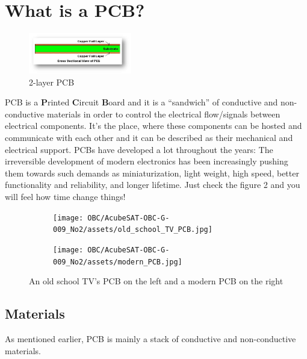 \documentclass[final]{cubedoc}
\begin{document}
	\section{What is a PCB?}
	
	\begin{figure}
		\centering
		\includegraphics[width=0.4\textwidth]{assets/simple_2_layer_PCB.jpg}
		\caption{2-layer PCB}
		\label{fig:1}
	\end{figure}
	
	PCB is a \textbf{P}rinted \textbf{C}ircuit \textbf{B}oard and it is  a “sandwich” of conductive and non-conductive materials in order to control the electrical flow/signals between electrical components. It’s the place, where these components can be hosted and communicate with each other and it can be described as their mechanical and electrical support. PCBs have developed a lot throughout the years: The irreversible development of modern electronics has been increasingly pushing them towards such demands as miniaturization, light weight, high speed, better functionality and reliability, and longer lifetime. Just check the figure 2 and you will feel how time change things!
	
	\begin{figure}[h!]
		\centering
		\begin{subfigure}{.5\textwidth}
			\centering
			\texttt{[image: OBC/AcubeSAT-OBC-G-009\_No2/assets/old\_school\_TV\_PCB.jpg]}
			\label{fig:sub1}
		\end{subfigure}%
		\begin{subfigure}{.5\textwidth}
			\centering
			\texttt{[image: OBC/AcubeSAT-OBC-G-009\_No2/assets/modern\_PCB.jpg]}
			\label{fig:sub2}
		\end{subfigure}
		\caption{An old school TV's PCB on the left and a modern PCB on the right}
		\label{fig:test}
	\end{figure}
	
	\subsection{Materials}
	
	As mentioned earlier, PCB is mainly a stack of conductive and non-conductive materials.
	
\end{document}
